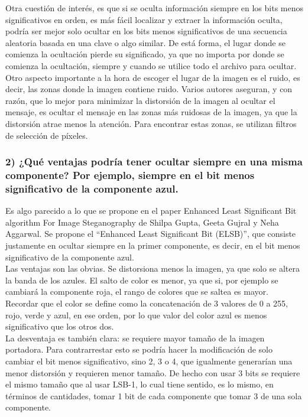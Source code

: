 \documentclass[a4paper,10pt]{article}
\begin{document}
Otra cuestión de interés, es que si se oculta información siempre en los bits menos significativos en orden, es más fácil localizar y extraer la información oculta, podría 
ser mejor solo ocultar en los bits menos significativos de una secuencia aleatoria basada en una clave o algo similar. De está forma, el lugar donde se comienza la ocultación
pierde su significado, ya que no importa por donde se comienza la ocultación, siempre y cuando se utilice todo el archivo para ocultar.\\

Otro aspecto importante a la hora de escoger el lugar de la imagen es el ruido, es decir, las zonas donde la imagen contiene ruido. Varios autores aseguran, y con razón, que lo mejor 
para minimizar la distorsión de la imagen al ocultar el mensaje, es ocultar el mensaje en las zonas más ruidosas de la imagen, ya que la distorsión atrae menos la atención. Para 
encontrar estas zonas, se utilizan filtros de selección de píxeles.

\subsubsection*{ 2) ¿Qué ventajas podría tener ocultar siempre en una misma componente? Por ejemplo, siempre
en el bit menos significativo de la componente azul.}

Es algo parecido a lo que se propone en el paper Enhanced Least Significant Bit algorithm For Image Steganography de 
Shilpa Gupta, Geeta Gujral y Neha Aggarwal. Se propone el “Enhanced Least Significant Bit (ELSB)”, que consiste justamente en ocultar siempre en 
la primer componente, es decir, en el bit menos significativo de la componente azul.\\

Las ventajas son las obvias. Se distorsiona menos la imagen, ya que solo se altera la banda de los azules. El salto de color es menor, ya que si, por ejemplo se 
cambiará la componente roja, el rango de colores que se saltea es mayor. Recordar que el color se define como la concatenación de 3 valores de 0 a 255, rojo, verde y azul, en 
ese orden, por lo que valor del color azul es menos significativo que los otros dos.\\

La desventaja es también clara: se requiere mayor tamaño de la imagen portadora. Para contrarrestar esto se podría hacer la modificación de solo
cambiar el bit menos significativo, sino 2, 3 o 4, que igualmente generarían una menor distorsión y requieren menor tamaño. De hecho con usar 3 bits se requiere el mismo 
tamaño que al usar LSB-1, lo cual tiene sentido, es lo mismo, en términos de cantidades, tomar 1 bit de cada componente que 
tomar 3 de una sola componente.\\
\end{document}
